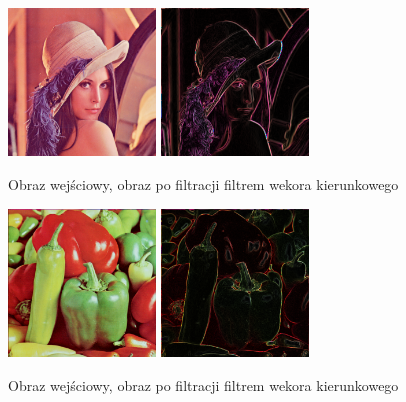 \documentclass[final,a4paper,openany,12pt]{mwbk}
\begin{document}
\begin{figure}[H]
	\begin{center}
		\includegraphics[width=0.35\textwidth]{lena_color}
		\includegraphics[width=0.35\textwidth]{lena_color_vdgPrewitt_result}
	\end{center}
	\caption{Obraz wejściowy, obraz po filtracji filtrem wekora kierunkowego}
\end{figure}

\begin{figure}[H]
	\begin{center}
		\includegraphics[width=0.35\textwidth]{peppers_color}
		\includegraphics[width=0.35\textwidth]{peppers_color_vdgPrewitt_result}
	\end{center}
	\caption{Obraz wejściowy, obraz po filtracji filtrem wekora kierunkowego}
\end{figure}
\end{document}
